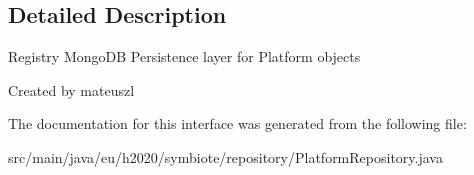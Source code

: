 \subsection{Detailed Description}
Registry Mongo\+DB Persistence layer for Platform objects

Created by mateuszl 

The documentation for this interface was generated from the following file\+:\begin{DoxyCompactItemize}
\item 
src/main/java/eu/h2020/symbiote/repository/Platform\+Repository.\+java\end{DoxyCompactItemize}
